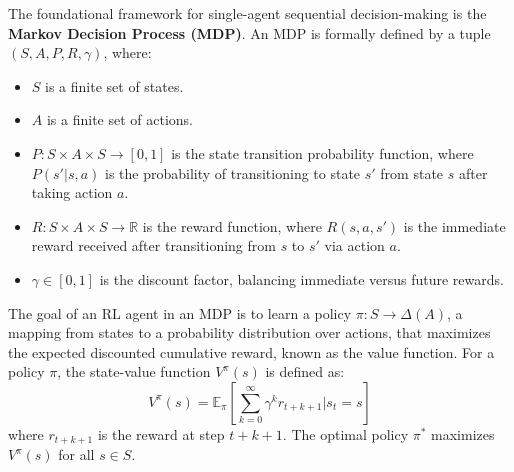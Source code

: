\documentclass[oneside]{memoir}
\begin{document}
The foundational framework for single-agent sequential decision-making is the \textbf{Markov Decision Process (MDP)}. An MDP is formally defined by a tuple $(S, A, P, R, \gamma)$, where:
\begin{itemize}
    \item $S$ is a finite set of states.
    \item $A$ is a finite set of actions.
    \item $P: S \times A \times S \rightarrow [0,1]$ is the state transition probability function, where $P(s'|s,a)$ is the probability of transitioning to state $s'$ from state $s$ after taking action $a$.
    \item $R: S \times A \times S \rightarrow \mathbb{R}$ is the reward function, where $R(s,a,s')$ is the immediate reward received after transitioning from $s$ to $s'$ via action $a$.
    \item $\gamma \in [0,1]$ is the discount factor, balancing immediate versus future rewards.
\end{itemize}
The goal of an RL agent in an MDP is to learn a policy $\pi: S \rightarrow \Delta(A)$, a mapping from states to a probability distribution over actions, that maximizes the expected discounted cumulative reward, known as the value function. For a policy $\pi$, the state-value function $V^{\pi}(s)$ is defined as:
\[
V^{\pi}(s) = \mathbb{E}_{\pi} \left[ \sum_{k=0}^{\infty} \gamma^k r_{t+k+1} | s_t=s \right]
\]
where $r_{t+k+1}$ is the reward at step $t+k+1$. The optimal policy $\pi^*$ maximizes $V^{\pi}(s)$ for all $s \in S$.
\end{document}
